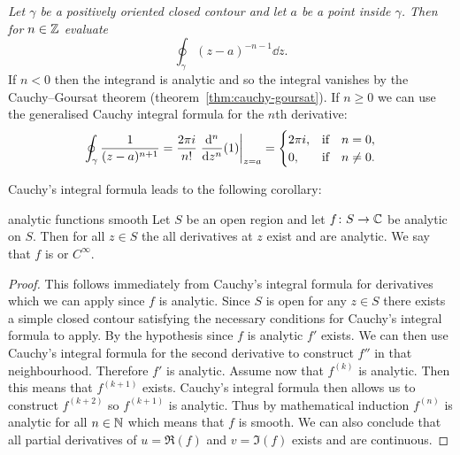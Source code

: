 \documentclass{article}
\begin{document}
    \begin{example}
        \textit{Let \(\gamma\) be a positively oriented closed contour and let \(a\) be a point inside \(\gamma\). Then for \(n\in\mathbb{Z}\) evaluate}
        \[\oint_\gamma (z - a)^{-n-1}\dd{z}.\]
        If \(n < 0\) then the integrand is analytic and so the integral vanishes by the Cauchy--Goursat theorem (theorem~\ref{thm:cauchy-goursat}).
        If \(n \ge 0\) we can use the generalised Cauchy integral formula for the \(n\)th derivative:
        \[
            \oint_\gamma \frac{1}{(z - a)^{n + 1}} = \frac{2\pi i}{n!} \eval{\dv[n]{z}(1)}_{z=a} = 
            \begin{cases}
                2\pi i, & \qif*n = 0,\\
                0, & \qif*n \ne 0.
            \end{cases}
        \]
    \end{example}
    Cauchy's integral formula leads to the following corollary:
    \begin{corollary}{}{analytic functions smooth}
        Let \(S\) be an open region and let \(f\colon S\to\mathbb{C}\) be analytic on \(S\).
        Then for all \(z\in S\) the all derivatives at \(z\) exist and are analytic.
        We say that \(f\) is  or \(C^\infty\).
    \end{corollary}
    \begin{proof}
        This follows immediately from Cauchy's integral formula for derivatives which we can apply since \(f\) is analytic.
        Since \(S\) is open for any \(z\in S\) there exists a simple closed contour satisfying the necessary conditions for Cauchy's integral formula to apply.
        By the hypothesis since \(f\) is analytic \(f'\) exists.
        We can then use Cauchy's integral formula for the second derivative to construct \(f''\) in that neighbourhood.
        Therefore \(f'\) is analytic.
        Assume now that \(f^{(k)}\) is analytic.
        Then this means that \(f^{(k+1)}\) exists.
        Cauchy's integral formula then allows us to construct \(f^{(k+2)}\) so \(f^{(k + 1)}\) is analytic.
        Thus by mathematical induction \(f^{(n)}\) is analytic for all \(n\in\mathbb{N}\) which means that \(f\) is smooth.
        We can also conclude that all partial derivatives of \(u = \Re(f)\) and \(v = \Im(f)\) exists and are continuous.
    \end{proof}
    
\end{document}
